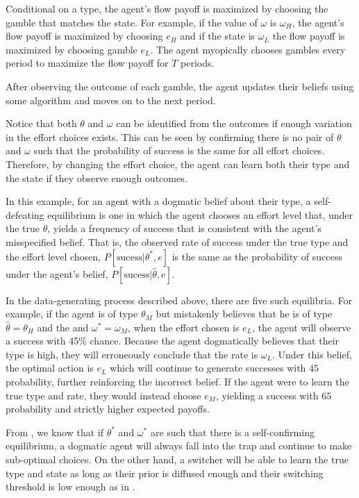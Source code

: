\documentclass[
  12pt,
]{article}
\begin{document}
Conditional on a type, the agent's flow payoff is maximized by choosing
the gamble that matches the state. For example, if the value of
\(\omega\) is \(\omega_H\), the agent's flow payoff is maximized by
choosing \(e_H\) and if the state is \(\omega_L\) the flow payoff is
maximized by choosing gamble \(e_L\). The agent myopically chooses
gambles every period to maximize the flow payoff for \(T\) periods.

After observing the outcome of each gamble, the agent updates their
beliefs using some algorithm and moves on to the next period.

Notice that both \(\theta\) and \(\omega\) can be identified from the
outcomes if enough variation in the effort choices exists. This can be
seen by confirming there is no pair of \(\theta\) and \(\omega\) such
that the probability of success is the same for all effort choices.
Therefore, by changing the effort choice, the agent can learn both their
type and the state if they observe enough outcomes.

In this example, for an agent with a dogmatic belief about their type, a
self-defeating equilibrium is one in which the agent chooses an effort
level that, under the true \(\theta\), yields a frequency of success
that is consistent with the agent's misspecified belief. That is, the
observed rate of success under the true type and the effort level
chosen, \(P[\text{sucess}|\theta^*, e]\) is the same as the probability
of success under the agent's belief,
\(P[\text{sucess}|\hat{\theta}, e]\).

In the data-generating process described above, there are five such
equilibria. For example, if the agent is of type \(\theta_M\) but
mistakenly believes that he is of type \(\hat{\theta}=\theta_H\) and the
and \(\omega^* = \omega_M\), when the effort chosen is \(e_L\), the
agent will observe a success with 45\% chance. Because the agent
dogmatically believes that their type is high, they will erroneously
conclude that the rate is \(\omega_L\). Under this belief, the optimal
action is \(e_L\) which will continue to generate successes with \(45%
\) probability, further reinforcing the incorrect belief. If the agent
were to learn the true type and rate, they would instead choose \(e_M\),
yielding a success with \(65%
\) probability and strictly higher expected payoffs.

From \citet{Heidhues2018}, we know that if \(\theta^*\) and \(\omega^*\)
are such that there is a self-confirming equilibrium, a dogmatic agent
will always fall into the trap and continue to make sub-optimal choices.
On the other hand, a switcher will be able to learn the true type and
state as long as their prior is diffused enough and their switching
threshold is low enough as in \citet{Ba2023}.
\end{document}

